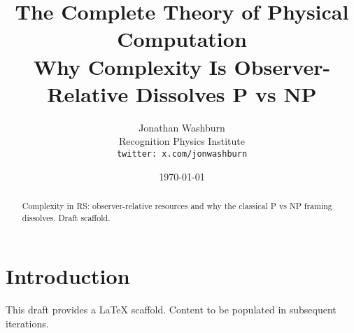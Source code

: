 \documentclass[11pt,letterpaper]{article}
\title{The Complete Theory of Physical Computation\\Why Complexity Is Observer-Relative Dissolves P vs NP}
\author{Jonathan Washburn\\Recognition Physics Institute\\\texttt{twitter: x.com/jonwashburn}}
\date{\today}
\begin{document}
\maketitle
\begin{abstract}
Complexity in RS: observer-relative resources and why the classical P vs NP framing dissolves. Draft scaffold.
\end{abstract}
\section{Introduction}
This draft provides a LaTeX scaffold. Content to be populated in subsequent iterations.
\end{document}
